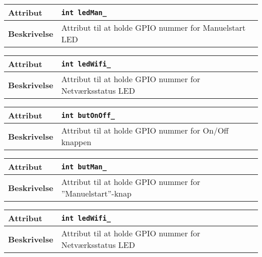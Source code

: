 \begin{center}
    \begin{tabular}{ | l | p{} |}
    \hline
    \textbf{Attribut}		& \verb+int ledMan_ +										\\ \hline
    \textbf{Beskrivelse} 	& Attribut til at holde GPIO nummer for Manuelstart LED		\\ \hline
    \end{tabular}
\end{center}

\begin{center}
    \begin{tabular}{ | l | p{} |}
    \hline
	\textbf{Attribut}	& \verb+int ledWifi_ +										\\ \hline
	\textbf{Beskrivelse}	& Attribut til at holde GPIO nummer for Netværksstatus LED	\\ \hline
    \end{tabular}
\end{center}

\begin{center}
    \begin{tabular}{ | l | p{} |}
    \hline
	\textbf{Attribut}	& \verb+int butOnOff_ +									\\ \hline
	\textbf{Beskrivelse}	& Attribut til at holde GPIO nummer for On/Off knappen 	\\ \hline
    \end{tabular}
\end{center}

\begin{center}
    \begin{tabular}{ | l | p{} |}
    \hline
	\textbf{Attribut}	& \verb+int butMan_ +										\\ \hline
	\textbf{Beskrivelse}	& Attribut til at holde GPIO nummer for ''Manuelstart''-knap	\\ \hline
    \end{tabular}
\end{center}

\begin{center}
    \begin{tabular}{ | l | p{} |}
    \hline
    \textbf{Attribut}		& \verb+int ledWifi_ +										\\ \hline
    \textbf{Beskrivelse} 	& Attribut til at holde GPIO nummer for Netværksstatus LED	\\ \hline
    \end{tabular}
\end{center}

